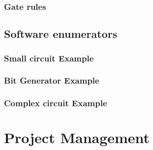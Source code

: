 \begin{appendices}
    \subsubsection*{Gate rules}
    \label{sec:app:gate:rules}
    

    \subsection*{Software enumerators}
    \label{sec:app:sol-enum}
    \subsubsection*{Small circuit Example}
    
    \subsubsection*{Bit Generator Example}
    
    \subsubsection*{Complex circuit Example}
    


    \section*{Project Management}

\end{appendices}

